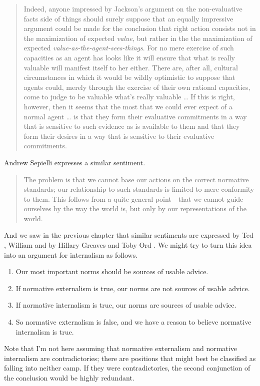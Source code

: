 \begin{quote}
Indeed, anyone impressed by Jackson's argument on the non-evaluative facts side of things should surely suppose that an equally impressive argument could be made for the conclusion that right action consists not in the maximization of expected \emph{value}, but rather in the the maximization of expected \emph{value-as-the-agent-sees-things}. For no mere exercise of such capacities as an agent has looks like it will ensure that what is really valuable will manifest itself to her either. There are, after all, cultural circumstances in which it would be wildly optimistic to suppose that agents could, merely through the exercise of their own rational capacities, come to judge to be valuable what's really valuable {\ldots} If this is right, however, then it seems that the most that we could ever expect of a normal agent {\ldots} is that they form their evaluative commitments in a way that is sensitive to such evidence as is available to them and that they form their desires in a way that is sensitive to their evaluative commitments. ~\citep[143]{Smith2006}
\end{quote}
Andrew Sepielli expresses a similar sentiment.

\begin{quote}
The problem is that we cannot base our actions on the correct normative standards; our relationship to such standards is limited to mere conformity to them. This follows from a quite general point---that we cannot guide ourselves by the way the world is, but only by our representations of the world. ~\citep[8]{Sepielli2009}
\end{quote}
And we saw in the previous chapter that similar sentiments are expressed by Ted \citet[8-9]{Lockhart2000}, William \citet[7]{MacAskillThesis} and by Hillary Greaves and Toby Ord \citeyearpar{GreavesOrd2017}. We might try to turn this idea into an argument for internalism as follows.

\begin{enumerate}
\item{} Our most important norms should be sources of usable advice.

\item{} If normative externalism is true, our norms are not sources of usable advice.

\item{} If normative internalism is true, our norms are sources of usable advice.

\item{} So normative externalism is false, and we have a reason to believe normative internalism is true.

\end{enumerate}
Note that I'm not here assuming that normative externalism and normative internalism are contradictories; there are positions that might best be classified as falling into neither camp. If they were contradictories, the second conjunction of the conclusion would be highly redundant.

